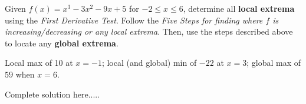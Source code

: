 \begin{example}
Given $f(x)=x^3-3x^2-9x+5$ for $-2\le x\le 6$, determine all \textbf{local extrema} using the \emph{First Derivative Test}. Follow the \emph{Five Steps for finding where $f$ is increasing/decreasing or any local extrema}. Then, use the steps described above to locate any \textbf{global extrema}.
    \begin{sol}
    Local max of 10 at $x=-1$; local (and global) min of $-22$ at $x=3$; global max of $59$ when $x=6$.
    \end{sol}
    \begin{solL}
    Complete solution here.....
    
    \end{solL}
    
\end{example}
\vspace{0.6in}

